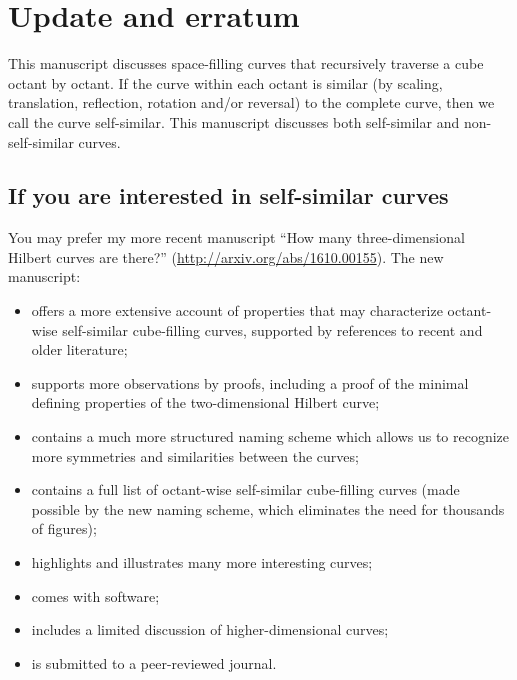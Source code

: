 \documentclass[11pt,a4paper]{article}
\begin{document}
\clearpage

\section{Update and erratum}\label{apx:update}

This manuscript discusses space-filling curves that recursively traverse a cube octant by octant. If the curve within each octant is similar (by scaling, translation, reflection, rotation and/or reversal) to the complete curve, then we call the curve self-similar. This manuscript discusses both self-similar and non-self-similar curves.

\subsection*{If you are interested in self-similar curves}
You may prefer my more recent manuscript ``How many three-dimensional Hilbert curves are there?'' (\url{http://arxiv.org/abs/1610.00155}). The new manuscript:\begin{itemize}
\item offers a more extensive account of properties that may characterize octant-wise self-similar cube-filling curves, supported by references to recent and older literature;
\item supports more observations by proofs, including a proof of the minimal defining properties of the two-dimensional Hilbert curve;
\item contains a much more structured naming scheme which allows us to recognize more symmetries and similarities between the curves;
\item contains a full list of octant-wise self-similar cube-filling curves (made possible by the new naming scheme, which eliminates the need for thousands of figures);
\item highlights and illustrates many more interesting curves;
\item comes with software;
\item includes a limited discussion of higher-dimensional curves;
\item is submitted to a peer-reviewed journal.
\end{itemize}
\end{document}
